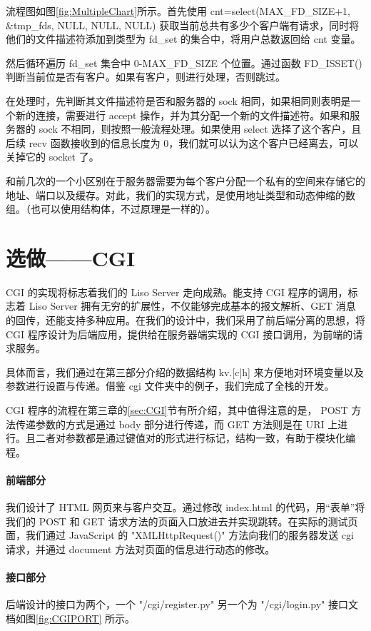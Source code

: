 流程图如图\ref{fig:MultipleChart}所示。首先使用 cnt=select(MAX\_FD\_SIZE+1, \&tmp\_fds, NULL, NULL, NULL) 获取当前总共有多少个客户端有请求，同时将他们的文件描述符添加到类型为 fd\_set 的集合中，将用户总数返回给 cnt 变量。

然后循环遍历 fd\_set 集合中 0-MAX\_FD\_SIZE 个位置。通过函数 FD\_ISSET() 判断当前位是否有客户。如果有客户，则进行处理，否则跳过。

在处理时，先判断其文件描述符是否和服务器的 sock 相同，如果相同则表明是一个新的连接，需要进行 accept 操作，并为其分配一个新的文件描述符。如果和服务器的 sock 不相同，则按照一般流程处理。如果使用 select 选择了这个客户，且后续 recv 函数接收到的信息长度为 0，我们就可以认为这个客户已经离去，可以关掉它的 socket 了。

和前几次的一个小区别在于服务器需要为每个客户分配一个私有的空间来存储它的地址、端口以及缓存。对此，我们的实现方式，是使用地址类型和动态伸缩的数组。（也可以使用结构体，不过原理是一样的）。

\section{选做——CGI}

CGI 的实现将标志着我们的 Liso Server 走向成熟。能支持 CGI 程序的调用，标志着 Liso Server 拥有无穷的扩展性，不仅能够完成基本的报文解析、GET 消息的回传，还能支持多种应用。在我们的设计中，我们采用了前后端分离的思想，将 CGI 程序设计为后端应用，提供给在服务器端实现的 CGI 接口调用，为前端的请求服务。

具体而言，我们通过在第三部分介绍的数据结构 kv.[c|h] 来方便地对环境变量以及参数进行设置与传递。借鉴 cgi 文件夹中的例子，我们完成了全栈的开发。

CGI 程序的流程在第三章的\ref{sec:CGI}节有所介绍，其中值得注意的是， POST 方法传递参数的方式是通过 body 部分进行传递，而 GET 方法则是在 URI 上进行。且二者对参数都是通过键值对的形式进行标记，结构一致，有助于模块化编程。


\paragraph*{前端部分} 我们设计了 HTML 网页来与客户交互。通过修改 index.html 的代码，用“表单”将我们的 POST 和 GET 请求方法的页面入口放进去并实现跳转。在实际的测试页面，我们通过 JavaScript 的 "XMLHttpRequest()" 方法向我们的服务器发送 cgi 请求，并通过 document 方法对页面的信息进行动态的修改。

\paragraph*{接口部分} 后端设计的接口为两个，一个 "/cgi/register.py" 另一个为 "/cgi/login.py" 接口文档如图\ref{fig:CGIPORT} 所示。

